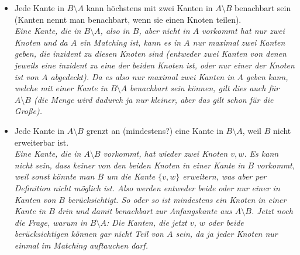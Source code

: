 \documentclass[paper=a4,10pt]{scrartcl}
\begin{document}
\begin{itemize}
\item Jede Kante in $B \setminus A$ kann höchstens mit zwei Kanten in $A \setminus B$ benachbart sein (Kanten nennt man benachbart, wenn sie einen Knoten teilen). \\
\textit{Eine Kante, die in $B \setminus A$, also in $B$, aber nicht in $A$ vorkommt hat nur zwei Knoten und da $A$ ein Matching ist, kann es in $A$ nur maximal zwei Kanten geben, die inzident zu diesen Knoten sind (entweder zwei Kanten von denen jeweils eine inzident zu eine der beiden Knoten ist, oder nur einer der Knoten ist von $A$ abgedeckt). Da es also nur maximal zwei Kanten in $A$ geben kann, welche mit einer Kante in $B \setminus A$ benachbart sein können, gilt dies auch für $A \setminus B$ (die Menge wird dadurch ja nur kleiner, aber das gilt schon für die Große).}

\item Jede Kante in $A \setminus B$ grenzt an (mindestens?) eine Kante in $B \setminus A$, weil $B$ nicht erweiterbar ist.\\
\textit{Eine Kante, die in $A \setminus B$ vorkommt, hat wieder zwei Knoten $v, w$. Es kann nicht sein, dass keiner von den beiden Knoten in einer Kante in $B$ vorkommt, weil sonst könnte man $B$ um die Kante $\{v, w\}$ erweitern, was aber per Definition nicht möglich ist. Also werden entweder beide oder nur einer in Kanten von $B$ berücksichtigt. So oder so ist mindestens ein Knoten in einer Kante in $B$ drin und damit benachbart zur Anfangskante aus $A \setminus B$. Jetzt noch die Frage, warum in $B\setminus A$: Die Kanten, die jetzt $v$, $w$ oder beide berücksichtigen können gar nicht Teil von $A$ sein, da ja jeder Knoten nur einmal im Matching auftauchen darf.}


\end{itemize}
\end{document}
